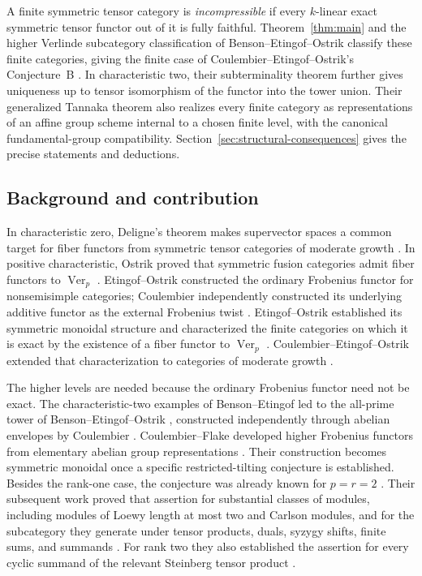 A finite symmetric tensor category is \emph{incompressible} if every
$k$-linear exact symmetric tensor functor out of it is fully faithful.
Theorem~\ref{thm:main} and the higher Verlinde subcategory classification
of Benson--Etingof--Ostrik \cite{BEO2023} classify these finite categories,
giving the finite case of Coulembier--Etingof--Ostrik's Conjecture~B
\cite{CoulembierEtingofOstrikIncompressible}.
In characteristic two, their subterminality theorem further gives
uniqueness up to tensor isomorphism of the functor into the tower union.
Their generalized Tannaka theorem also realizes every finite category
as representations of an affine group scheme internal to a chosen finite
level, with the canonical fundamental-group compatibility.
Section~\ref{sec:structural-consequences} gives the precise statements
and deductions.

\subsection*{Background and contribution}

In characteristic zero, Deligne's theorem makes supervector spaces a
common target for fiber functors from symmetric tensor categories of
moderate growth \cite{Deligne2002}. In positive characteristic, Ostrik proved that
symmetric fusion categories admit fiber functors to
$\operatorname{Ver}_p$ \cite[Theorem~1.5]{Ostrik2020}.
Etingof--Ostrik constructed the ordinary Frobenius functor for
nonsemisimple categories; Coulembier independently constructed its
underlying additive functor as the external Frobenius twist
\cite[Section~4.3]{Coulembier2020Tannakian}.
Etingof--Ostrik established its symmetric monoidal structure and
characterized the finite categories on which it is exact by the
existence of a fiber functor to $\operatorname{Ver}_p$
\cite[Proposition~5.1 and Theorem~8.1]{EtingofOstrikFrobenius}.
Coulembier--Etingof--Ostrik extended that characterization to categories
of moderate growth \cite{CoulembierEtingofOstrik2023}.

The higher levels are needed because the ordinary Frobenius functor
need not be exact. The characteristic-two examples of Benson--Etingof
\cite{BensonEtingof2019} led to the all-prime tower of
Benson--Etingof--Ostrik \cite{BEO2023}, constructed independently through
abelian envelopes by Coulembier \cite{Coulembier2021Envelopes}.
Coulembier--Flake developed higher Frobenius functors from elementary
abelian group representations \cite{CoulembierFlakeHigher}.
Their construction becomes symmetric monoidal once a specific
restricted-tilting conjecture is established. Besides the rank-one case,
the conjecture was already known for $p=r=2$
\cite[Remark~5.4.4(1) and Section~6]{CoulembierFlakeHigher}.
Their subsequent work
proved that assertion for substantial classes of modules, including
modules of Loewy length at most two and Carlson modules, and for the
subcategory they generate under tensor products, duals, syzygy shifts,
finite sums, and summands \cite[Theorem~2]{CoulembierFlakeSteinberg}.
For rank two they also established the assertion for every cyclic
summand of the relevant Steinberg tensor product
\cite[Theorem~3]{CoulembierFlakeSteinberg}.

